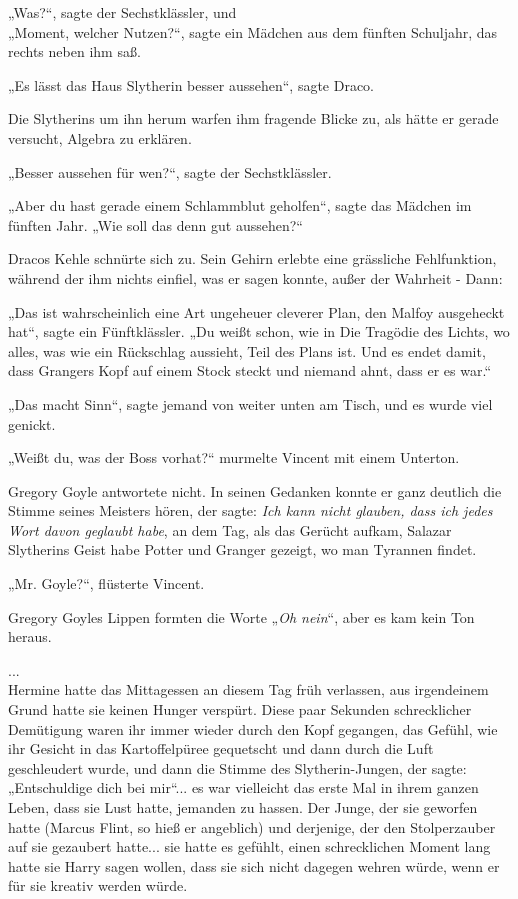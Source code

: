 {„Was?“, sagte der Sechstklässler, und\\ „Moment, welcher Nutzen?“, sagte ein Mädchen aus dem fünften Schuljahr, das rechts neben ihm saß.

„Es lässt das Haus Slytherin besser aussehen“, sagte Draco.

Die Slytherins um ihn herum warfen ihm fragende Blicke zu, als hätte er gerade versucht, Algebra zu erklären.

„Besser aussehen für wen?“, sagte der Sechstklässler.

„Aber du hast gerade einem Schlammblut geholfen“, sagte das Mädchen im fünften Jahr. „Wie soll das denn gut aussehen?“

Dracos Kehle schnürte sich zu. Sein Gehirn erlebte eine grässliche Fehlfunktion, während der ihm nichts einfiel, was er sagen konnte, außer der Wahrheit - Dann:

„Das ist wahrscheinlich eine Art ungeheuer cleverer Plan, den Malfoy ausgeheckt hat“, sagte ein Fünftklässler. „Du weißt schon, wie in Die Tragödie des Lichts, wo alles, was wie ein Rückschlag aussieht, Teil des Plans ist. Und es endet damit, dass Grangers Kopf auf einem Stock steckt und niemand ahnt, dass er es war.“

„Das macht Sinn“, sagte jemand von weiter unten am Tisch, und es wurde viel genickt.

„Weißt du, was der Boss vorhat?“ murmelte Vincent mit einem Unterton.

Gregory Goyle antwortete nicht. In seinen Gedanken konnte er ganz deutlich die Stimme seines Meisters hören, der sagte: \emph{Ich kann nicht glauben, dass ich jedes Wort davon geglaubt habe}, an dem Tag, als das Gerücht aufkam, Salazar Slytherins Geist habe Potter und Granger gezeigt, wo man Tyrannen findet.

„Mr. Goyle?“, flüsterte Vincent.

Gregory Goyles Lippen formten die Worte „\emph{Oh nein}“, aber es kam kein Ton heraus.

...\\ Hermine hatte das Mittagessen an diesem Tag früh verlassen, aus irgendeinem Grund hatte sie keinen Hunger verspürt. Diese paar Sekunden schrecklicher Demütigung waren ihr immer wieder durch den Kopf gegangen, das Gefühl, wie ihr Gesicht in das Kartoffelpüree gequetscht und dann durch die Luft geschleudert wurde, und dann die Stimme des Slytherin-Jungen, der sagte: „Entschuldige dich bei mir“... es war vielleicht das erste Mal in ihrem ganzen Leben, dass sie Lust hatte, jemanden zu hassen. Der Junge, der sie geworfen hatte (Marcus Flint, so hieß er angeblich) und derjenige, der den Stolperzauber auf sie gezaubert hatte... sie hatte es gefühlt, einen schrecklichen Moment lang hatte sie Harry sagen wollen, dass sie sich nicht dagegen wehren würde, wenn er für sie kreativ werden würde.

}
